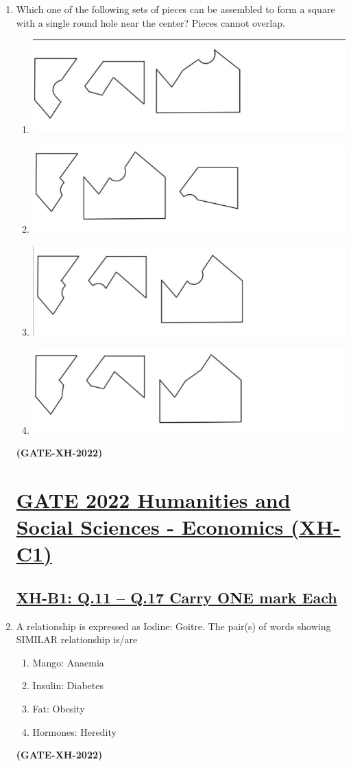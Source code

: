 \documentclass[journal]{IEEEtran}
\begin{document}
\begin{enumerate}
\item Which one of the following sets of pieces can be assembled to form a square with a single round hole near the center? Pieces cannot overlap.
\begin{enumerate}
\item \includegraphics[width=0.5\columnwidth]{figs/Q10(A).jpeg}
\item \includegraphics[width=0.5\columnwidth]{figs/Q10(B).jpg}
\item \includegraphics[width=0.5\columnwidth]{figs/Q10(C).jpeg}
\item \includegraphics[width=0.5\columnwidth]{figs/Q10(D).jpeg}

\end{enumerate}
\hfill\textbf{(GATE-XH-2022)}
\newpage
\section*{\large \underline{\textbf {GATE 2022 Humanities and Social Sciences - Economics (XH-C1)}}}
\vspace{0.2cm}
\subsection*{ \underline{\textbf {XH-B1: Q.11 – Q.17 Carry ONE mark Each}}}

\item A relationship is expressed as Iodine: Goitre. The pair(s) of words showing SIMILAR relationship is/are
\begin{enumerate}
\item Mango: Anaemia
\item Insulin: Diabetes
\item Fat: Obesity
\item Hormones: Heredity
\end{enumerate}
\hfill\textbf{(GATE-XH-2022)}


\end{enumerate}
\end{document}
